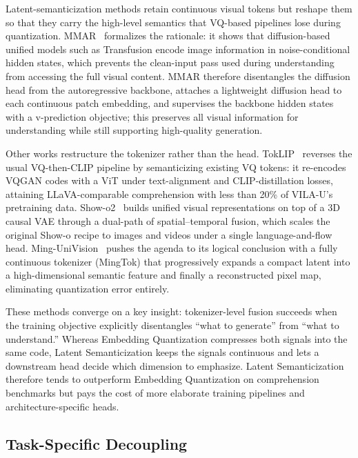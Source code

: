 Latent-semanticization methods retain continuous visual tokens but reshape them so that they carry the high-level semantics that VQ-based pipelines lose during quantization. MMAR~\cite{DBLP:conf/cvpr/YangYZRZ0Z25} formalizes the rationale: it shows that diffusion-based unified models such as Transfusion encode image information in noise-conditional hidden states, which prevents the clean-input pass used during understanding from accessing the full visual content. MMAR therefore disentangles the diffusion head from the autoregressive backbone, attaches a lightweight diffusion head to each continuous patch embedding, and supervises the backbone hidden states with a v-prediction objective; this preserves all visual information for understanding while still supporting high-quality generation.

Other works restructure the tokenizer rather than the head. TokLIP~\cite{Lin202505422} reverses the usual VQ-then-CLIP pipeline by semanticizing existing VQ tokens: it re-encodes VQGAN codes with a ViT under text-alignment and CLIP-distillation losses, attaining LLaVA-comparable comprehension with less than 20\% of VILA-U's pretraining data. Show-o2~\cite{Xie202515564} builds unified visual representations on top of a 3D causal VAE through a dual-path of spatial--temporal fusion, which scales the original Show-o recipe to images and videos under a single language-and-flow head. Ming-UniVision~\cite{Huang202506590} pushes the agenda to its logical conclusion with a fully continuous tokenizer (MingTok) that progressively expands a compact latent into a high-dimensional semantic feature and finally a reconstructed pixel map, eliminating quantization error entirely.

These methods converge on a key insight: tokenizer-level fusion succeeds when the training objective explicitly disentangles ``what to generate'' from ``what to understand.'' Whereas Embedding Quantization compresses both signals into the same code, Latent Semanticization keeps the signals continuous and lets a downstream head decide which dimension to emphasize. Latent Semanticization therefore tends to outperform Embedding Quantization on comprehension benchmarks but pays the cost of more elaborate training pipelines and architecture-specific heads.

\subsection{Task-Specific Decoupling}
\label{subsec:decoupling}

